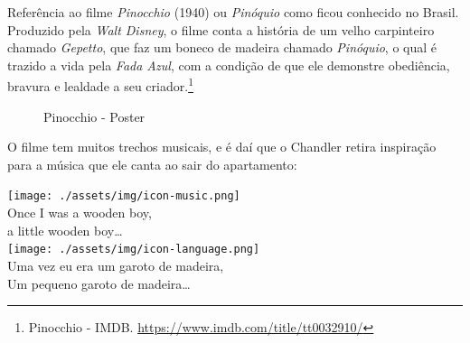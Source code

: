 Referência ao filme \emph{Pinocchio} (1940) ou \emph{Pinóquio} como
ficou conhecido no Brasil. Produzido pela \emph{Walt Disney}, o filme
conta a história de um velho carpinteiro chamado \emph{Gepetto}, que faz
um boneco de madeira chamado \emph{Pinóquio}, o qual é trazido a vida
pela \emph{Fada Azul}, com a condição de que ele demonstre obediência,
bravura e lealdade a seu criador.\footnote{\sloppy Pinocchio - IMDB. \url{https://www.imdb.com/title/tt0032910/}}

\saveparinfos
\noindent
\begin{minipage}[c]{0.35\textwidth}\useparinfo

\begin{figure}
  \centering
    \caption{Pinocchio - Poster\label{fig:pinocchio-poster}}
\end{figure}

\end{minipage}\hfill
\begin{minipage}[c]{0.6\textwidth}

O filme tem muitos trechos musicais, e é daí que o Chandler retira
inspiração para a música que ele canta ao sair do apartamento:

\end{minipage}

\bigskip
\begin{tcolorbox}[enhanced,
    drop fuzzy shadow southeast, boxrule=0.3pt,
    lower separated=false, sidebyside, sidebyside align=top,
    halign=flush right, halign lower=left, breakable,
    colframe=black!30!dialogoBorder,colback=musicaBg]
\texttt{[image: ./assets/img/icon-music.png]}\\
Once I was a wooden boy,\\a little wooden boy…\\
\tcblower
\texttt{[image: ./assets/img/icon-language.png]}\\
Uma vez eu era um garoto de madeira,\\Um pequeno garoto de madeira…\\
\end{tcolorbox}

